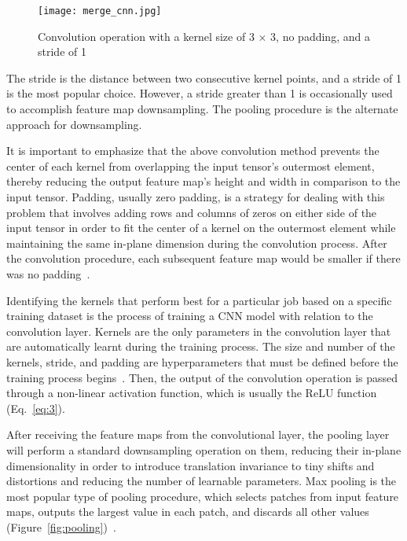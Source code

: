 \begin{figure}[htbp]
    \centering
    \texttt{[image: merge\_cnn.jpg]}
    \caption{Convolution operation with a kernel size of 3 × 3, no padding, and a stride of 1~\cite{Yamashita2018ConvolutionalRadiology}}
    \label{fig:merge_cnn}
\end{figure}

The stride is the distance between two consecutive kernel points, and a stride of 1 is the most popular choice. However, a stride greater than 1 is occasionally used to accomplish feature map downsampling. The pooling procedure is the alternate approach for downsampling.

It is important to emphasize that the above convolution method prevents the center of each kernel from overlapping the input tensor's outermost element, thereby reducing the output feature map's height and width in comparison to the input tensor. Padding, usually zero padding, is a strategy for dealing with this problem that involves adding rows and columns of zeros on either side of the input tensor in order to fit the center of a kernel on the outermost element while maintaining the same in-plane dimension during the convolution process. After the convolution procedure, each subsequent feature map would be smaller if there was no padding~\cite{Yamashita2018ConvolutionalRadiology}.

Identifying the kernels that perform best for a particular job based on a specific training dataset is the process of training a \gls{CNN} model with relation to the convolution layer. Kernels are the only parameters in the convolution layer that are automatically learnt during the training process. The size and number of the kernels, stride, and padding are hyperparameters that must be defined before the training process begins~\cite{Yamashita2018ConvolutionalRadiology}. Then, the output of the convolution operation is passed through a non-linear activation function, which is usually the ReLU function (Eq.~\ref{eq:3}). 

After receiving the feature maps from the convolutional layer, the pooling layer will perform a standard downsampling operation on them, reducing their in-plane dimensionality in order to introduce translation invariance to tiny shifts and distortions and reducing the number of learnable parameters. Max pooling is the most popular type of pooling procedure, which selects patches from input feature maps, outputs the largest value in each patch, and discards all other values (Figure~\ref{fig:pooling})~\cite{Yamashita2018ConvolutionalRadiology}.

